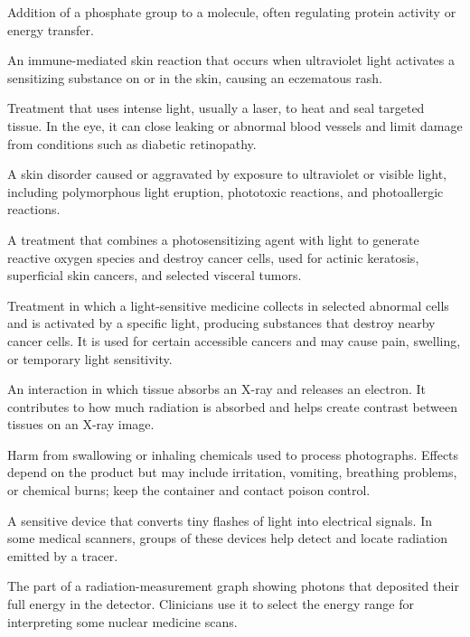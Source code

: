  Addition of a phosphate group to a molecule, often regulating protein activity or energy transfer.

 An immune-mediated skin reaction that occurs when ultraviolet light activates a sensitizing substance on or
in the skin, causing an eczematous rash.

 Treatment that uses intense light, usually a laser, to heat and seal targeted tissue. In the eye, it can close leaking or abnormal blood vessels and limit damage from conditions such as diabetic retinopathy.

 A skin disorder caused or aggravated by exposure to ultraviolet or visible light, including polymorphous light eruption, phototoxic reactions, and photoallergic reactions.

 A treatment that combines a photosensitizing agent with light to generate reactive
oxygen species and destroy cancer cells, used for actinic keratosis, superficial skin
cancers, and selected visceral tumors.

 Treatment in which a light-sensitive medicine collects in selected abnormal cells and is activated by a specific light, producing substances that destroy nearby cancer cells. It is used for certain accessible cancers and may cause pain, swelling, or temporary light sensitivity.

 An interaction in which tissue absorbs an X-ray and releases an electron. It contributes to how much radiation is absorbed and helps create contrast between tissues on an X-ray image.

 Harm from swallowing or inhaling chemicals used to process photographs. Effects depend on the product but may include irritation, vomiting, breathing problems, or chemical burns; keep the container and contact poison control.

 A sensitive device that converts tiny flashes of light into electrical signals. In some medical scanners, groups of these devices help detect and locate radiation emitted by a tracer.

 The part of a radiation-measurement graph showing photons that deposited their full energy in the detector. Clinicians use it to select the energy range for interpreting some nuclear medicine scans.

